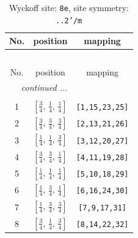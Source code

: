 \documentclass[fleqn,8pt]{jsarticle}
\begin{document}
\renewcommand{\arraystretch}{1.2}
\begin{longtable}{ccc}
\caption{Wyckoff site: {\tt 8e}, site symmetry: {\tt ..2'/m}}
 \\
 \hline \hline
No. & position & mapping \\ \hline \endfirsthead

\multicolumn{2}{l}{\tablename\ \thetable{}} \\
 \hline \hline
No. & position & mapping \\ \hline \endhead

 \hline \hline
\multicolumn{2}{r}{\footnotesize\it continued ...} \\ \endfoot

 \hline \hline
\multicolumn{2}{r}{} \\ \endlastfoot

1 & $\left[ \frac{3}{4},\, \frac{1}{4},\, \frac{1}{4} \right]$ & {\tt [1,15,23,25]} \\ \hline
2 & $\left[ \frac{3}{4},\, \frac{3}{4},\, \frac{3}{4} \right]$ & {\tt [2,13,21,26]} \\ \hline
3 & $\left[ \frac{1}{4},\, \frac{1}{4},\, \frac{3}{4} \right]$ & {\tt [3,12,20,27]} \\ \hline
4 & $\left[ \frac{3}{4},\, \frac{3}{4},\, \frac{1}{4} \right]$ & {\tt [4,11,19,28]} \\ \hline
5 & $\left[ \frac{1}{4},\, \frac{1}{4},\, \frac{1}{4} \right]$ & {\tt [5,10,18,29]} \\ \hline
6 & $\left[ \frac{1}{4},\, \frac{3}{4},\, \frac{1}{4} \right]$ & {\tt [6,16,24,30]} \\ \hline
7 & $\left[ \frac{1}{4},\, \frac{3}{4},\, \frac{3}{4} \right]$ & {\tt [7,9,17,31]} \\ \hline
8 & $\left[ \frac{3}{4},\, \frac{1}{4},\, \frac{3}{4} \right]$ & {\tt [8,14,22,32]} \\
\end{longtable}
\renewcommand{\arraystretch}{1.2}
\end{document}
